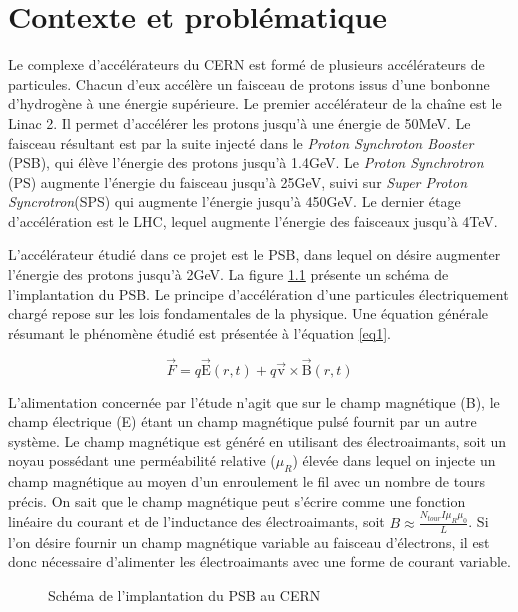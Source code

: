 \chapter{Contexte et problématique}
Le complexe d'accélérateurs du CERN est formé de plusieurs accélérateurs de particules. Chacun d'eux accélère un faisceau de protons issus d'une bonbonne d'hydrogène à une énergie supérieure. Le premier accélérateur de la chaîne est le Linac 2. Il permet d'accélérer les protons jusqu'à une énergie de 50MeV. Le faisceau résultant est par la suite injecté dans le \textit{Proton Synchroton Booster} (PSB), qui élève l'énergie des protons jusqu'à 1.4GeV. Le \textit{Proton Synchrotron} (PS) augmente l'énergie du faisceau jusqu'à 25GeV, suivi sur \textit{Super Proton Syncrotron}(SPS) qui augmente l'énergie jusqu'à 450GeV. Le dernier étage d'accélération est le LHC, lequel augmente l'énergie des faisceaux jusqu'à 4TeV. 

L'accélérateur étudié dans ce projet est le PSB, dans lequel on désire augmenter l'énergie des protons jusqu'à 2GeV.  La figure \ref{BOOSTER} présente un schéma de l'implantation du PSB. Le principe d'accélération d'une particules électriquement chargé repose sur les lois  fondamentales de la physique. Une équation générale résumant le phénomène étudié est présentée à l'équation \ref{eq1}.

\begin{equation}
\label{eq1}
\vec{F} = q\vec{\mbox{E}}(r,t) + q\vec{\mbox{v}}\times \vec{\mbox{B}}(r,t)
\end{equation}

L'alimentation concernée par l'étude n'agit que sur le champ magnétique (B), le champ électrique (E) étant un champ magnétique pulsé fournit par un autre système. Le champ magnétique est généré en utilisant des électroaimants, soit un noyau possédant une perméabilité relative ($\mu_R$) élevée dans lequel on injecte un champ magnétique au moyen d'un enroulement le fil avec un nombre de tours précis. On sait que le champ magnétique peut s'écrire comme une fonction linéaire du courant et de l'inductance des électroaimants, soit $B \approx \frac{N_{tour}I\mu_R \mu_0}{L}$. Si l'on désire fournir un champ magnétique variable au faisceau d'électrons, il est donc nécessaire d'alimenter les électroaimants avec une forme de courant variable. 

\begin{figure}[htb]
\centering
{}
\caption{Schéma de l'implantation du PSB au CERN}
\label{BOOSTER}
\end{figure}


